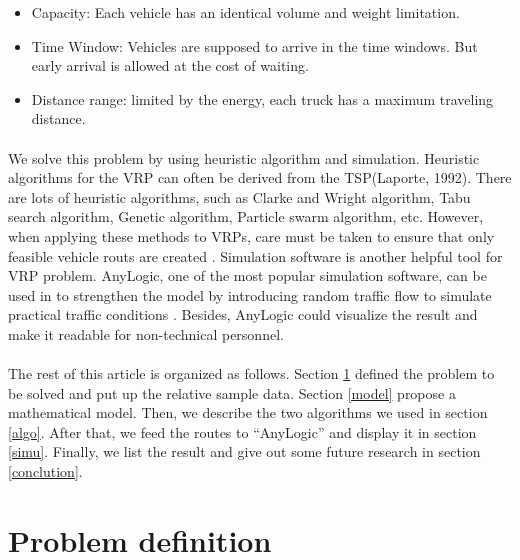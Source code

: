 \documentclass[12pt]{article}
\numberwithin{equation}{section}
\begin{document}
	\begin{itemize}
		\item Capacity: Each vehicle has an identical volume and weight limitation.\item Time Window: Vehicles are supposed to arrive in the time windows. But early arrival is allowed at the cost of waiting.\item Distance range: limited by the energy, each truck has a maximum traveling distance. 
	\end{itemize}

	\paragraph{}We solve this problem by using heuristic algorithm and simulation. Heuristic algorithms for the VRP can often be derived from  the TSP(Laporte, 1992). There are lots of heuristic algorithms, such as Clarke and Wright algorithm, Tabu search algorithm, Genetic algorithm, Particle swarm algorithm, etc. However, when applying these methods to VRPs, care must be taken to ensure that only feasible vehicle routs are created \parencite{Laporte1992}. Simulation software is another helpful tool for VRP problem. AnyLogic, one of the most popular simulation software, can be used in to strengthen the model by introducing random traffic flow to simulate practical traffic conditions \parencite{Fan2009}. Besides, AnyLogic could visualize the result and make it readable for non-technical personnel.
	
	\paragraph{}The rest of this article is organized as follows. Section \ref{problem} defined the problem to be solved and put up the relative sample data. Section \ref{model} propose a mathematical model. Then, we describe the two algorithms we used in section \ref{algo}. After that, we feed the routes to “AnyLogic” and display it in section \ref{simu}. Finally, we list the result and give out some future research in section \ref{conclution}.  

\section{Problem definition}\label{problem}
\end{document}
